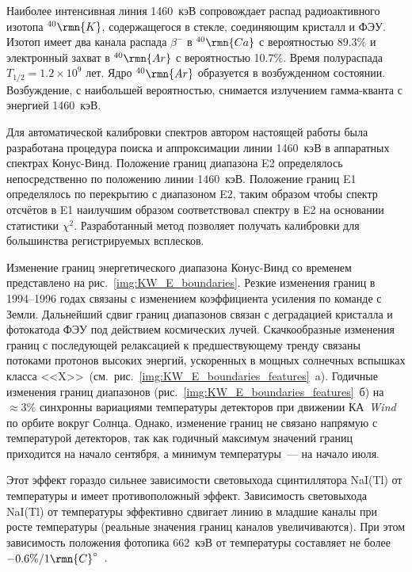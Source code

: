Наиболее интенсивная линия 1460~кэВ сопровождает распад радиоактивного 
изотопа $^{40}\rmn{K}$, содержащегося в стекле, соединяющим кристалл и ФЭУ. 
Изотоп имеет два канала распада $\beta^{-}$ в $^{40}\rmn{Ca}$ с 
вероятностью 89.3\% и электронный захват в $^{40}\rmn{Ar}$ с вероятностью 10.7\%. 
Время полураспада $T_{1/2}=1.2\times10^9$ лет. Ядро $^{40}\rmn{Ar}$ образуется в
возбужденном состоянии. Возбуждение, с наибольшей вероятностью, снимается 
излучением гамма-кванта с энергией 1460~кэВ.

Для автоматической калибровки спектров автором настоящей работы была 
разработана процедура поиска и аппроксимации линии 1460~кэВ в аппаратных спектрах 
Конус-Винд. Положение границ диапазона E2 определялось непосредственно по положению 
линии 1460~кэВ. Положение границ E1 определялось по перекрытию с диапазоном E2, 
таким образом чтобы спектр отсчётов в E1 наилучшим образом соответствовал спектру в E2 
на основании статистики $\chi^2$. Разработанный метод позволяет получать калибровки 
для большинства регистрируемых всплесков.

Изменение границ энергетического диапазона Конус-Винд со временем представлено 
на рис.~\ref{img:KW_E_boundaries}. Резкие изменения границ в 1994--1996 годах 
связаны с изменением коэффициента усиления по команде с Земли. Дальнейший сдвиг 
границ диапазонов связан с деградацией кристалла и фотокатода ФЭУ под действием 
космических лучей. Скачкообразные изменения границ с последующей релаксацией 
к предшествующему тренду связаны потоками протонов высоких энергий, ускоренных в мощных 
солнечных вспышках класса <<X>>\ (см.~рис.~\ref{img:KW_E_boundaries_features}~a). 
Годичные изменения границ диапазонов (рис.~\ref{img:KW_E_boundaries_features}~б) 
на $\approx 3$\% синхронны вариациями температуры детекторов при движении 
КА~\textit{Wind} по орбите вокруг Солнца. Однако, изменение границ не связано напрямую 
с температурой детекторов, так как годичный максимум значений границ приходится на 
начало сентября, а минимум температуры~--- на начало июля. 

Этот эффект гораздо сильнее зависимости световыхода сцинтиллятора NaI(Tl) 
от температуры и имеет противоположный эффект. Зависимость световыхода NaI(Tl) от 
температуры эффективно сдвигает линию в младшие каналы при росте температуры 
(реальные значения границ каналов увеличиваются). При этом зависимость положения 
фотопика 662~кэВ от температуры составляет не более~$-0.6\textrm{\%}/1 \rmn{C}^{\circ}$~\citep{Ianakiev_2009NIMP}.

